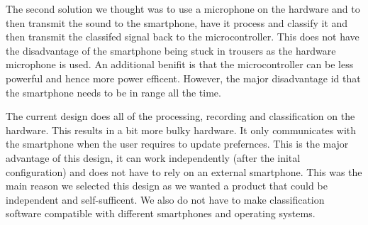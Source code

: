 \documentclass[12pt, titlepage]{article}
\begin{document}
\begin{appendices}
\begin{enumerate}
The second solution we thought was to use a microphone on the hardware and to then transmit the sound to the smartphone, have it process and classify it and then transmit the classifed signal back to the microcontroller. This does not have the disadvantage of the smartphone being stuck in trousers as the hardware microphone is used. An additional benifit is that the microcontroller can be less powerful and hence more power efficent. However, the major disadvantage id that the smartphone needs to be in range all the time.    

The current design does all of the processing, recording and classification on the hardware. This results in a bit more bulky hardware. It only communicates with the smartphone when the user requires to update prefernces. This is the major advantage of this design, it can work independently (after the inital configuration) and does not have to rely on an external smartphone. This was the main reason we selected this design as we wanted a product that could be independent and self-sufficent. We also do not have to make classification software compatible with different smartphones and operating systems.   
  \end{enumerate}
  
  \end{appendices}
\end{document}
